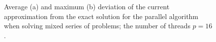 \documentclass[smallcondensed]{svjour3}     %
\begin{document}
\begin{figure}
\begin{minipage}{0.5\linewidth}
\end{minipage}
\hfill
\begin{minipage}{0.5\linewidth}
\end{minipage}
\caption{Average (a) and maximum (b) deviation of the current approximation from the exact solution for the parallel algorithm when solving mixed series of problems; the number of threads $p = 16$.}
\label{fig_last7}
\end{figure}
\end{document}
